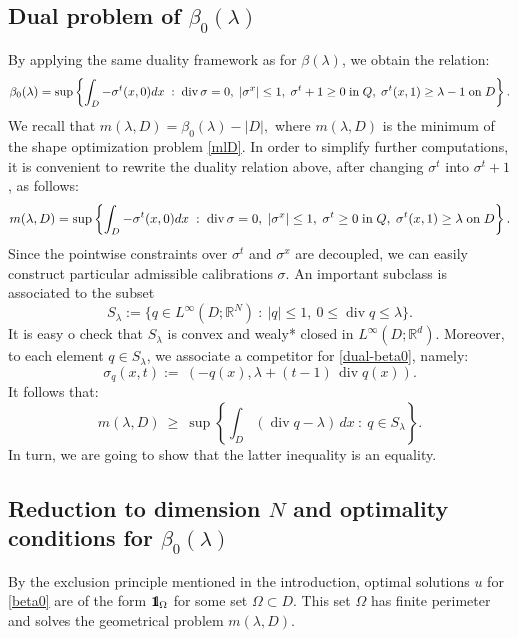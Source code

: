 \documentclass[reqno,11pt]{amsart}
\theoremstyle{definition}
\numberwithin{equation}{section}
\DeclareMathOperator{\Div}{div}
\def\R{\mathbb{R}}
\newcommand{\tinm}[1]{\text{\;#1\;}}
\newcommand{\1}{{{\bf 1}\kern-0,28em\rm l}}
\newcommand{\one}{{{\bf 1}\kern-0,28em\rm l}}
\def\sepa{\; : \;}
\newcommand{\aco}[1]{\left\{#1\right\}}
\def\l{\lambda}
\begin{document}
\subsection{Dual problem of \texorpdfstring{$\beta_0(\lambda)$}{beta0}}

By applying the same duality framework as for $\beta(\l)$, we obtain the relation:
\begin{align*}
\beta_0(\lambda) = \sup \aco{\int_D-\sigma^t(x,0)dx \sepa \Div\sigma =0,\; |\sigma^x| \le 1,\; \sigma^t +1  \ge 0 \tinm{in} Q,\; \sigma^t(x,1) \ge \lambda -1 \tinm{on} D} .
\end{align*}
We recall that $m(\l,D)= \beta_0(\l) - |D| ,$ where $m(\l,D)$ is the minimum of the  shape optimization problem \eqref{mlD}.
In order to simplify further computations, it is convenient to rewrite the duality relation above, after changing $\sigma^t$ into $\sigma^t +1$, as follows:
\begin{align}\label{dual-beta0}
m(\l, D) = \sup \aco{\int_D-\sigma^t(x,0)dx \sepa \Div\sigma =0,\; |\sigma^x| \le 1,\; \sigma^t  \ge 0 \tinm{in} Q,\; \sigma^t(x,1) \ge \lambda  \tinm{on} D} .
\end{align}
Since the pointwise constraints over $\sigma^t$ and $\sigma^x$ are decoupled, we can easily construct particular admissible calibrations $\sigma$. An important subclass is associated to the subset 
$$S_\l :=  \{ q\in L^\infty(D;\R^N)\ :\ |q| \le 1 ,\  0\le \Div q \le \l \}.$$
It is easy o check that $S_\l$ is convex and wealy* closed in $L^\infty(D;\R^d)$. Moreover, to each element $q\in S_\l$, we associate a competitor for \eqref{dual-beta0}, namely:
$$ \sigma_q (x,t) :=\  \left(-q(x), \l +  (t-1)\, \Div q(x)\right) .$$
It follows that:
$$ m(\l, D)  \ \ge\ \sup \left\{ \int_D ( \Div q- \l )\, dx \ :\  q \in S_\l \right\}.$$  
In turn, we are going to show that the latter inequality is an equality.


\subsection*{Reduction to dimension $N$ and optimality conditions for $\beta_0(\l)$ }

By the exclusion principle mentioned in the introduction, optimal solutions $u$ for \eqref{beta0} are of the form
 $\one_\Omega$ for some set  $\Omega\subset D$. This set $\Omega$ has finite perimeter and solves the geometrical problem $m(\l, D)$.
\end{document}
